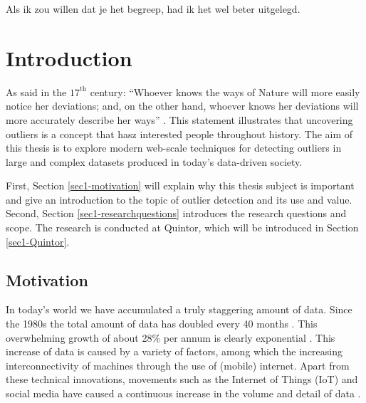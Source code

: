 \begin{savequote}[78mm] 
Als ik zou willen dat je het begreep, had ik het wel beter uitgelegd.  
\end{savequote}

\chapter{Introduction}

As said in the $17^{\text{th}}$ century: ``Whoever knows the ways of Nature will more easily notice her deviations; and, on the other hand, whoever knows her deviations will more accurately describe her ways'' \cite{bacon2010novum}. This statement illustrates that uncovering outliers is a concept that hasz interested people throughout history. The aim of this thesis is to explore modern web-scale techniques for detecting outliers in large and complex datasets produced in today's data-driven society.

First, Section \ref{sec1-motivation} will explain why this thesis subject is important and give an introduction to the topic of outlier detection and its use and value. Second, Section \ref{sec1-researchquestions} introduces the research questions and scope. The research is conducted at Quintor, which will be introduced in Section \ref{sec1-Quintor}. 

\section{Motivation \label{sec1-motivation}}
In today's world we have accumulated a truly staggering amount of data. Since the 1980s the total amount of data has doubled every 40 months \cite{Hilbert01042011}. This overwhelming growth of about 28\% per annum is clearly exponential \cite{6479953}. This increase of data is caused by a variety of factors, among which the increasing interconnectivity of machines through the use of (mobile) internet. Apart from these technical innovations, movements such as the Internet of Things (IoT) and social media have caused a continuous increase in the volume and detail of data \cite{holler2014from}. 

